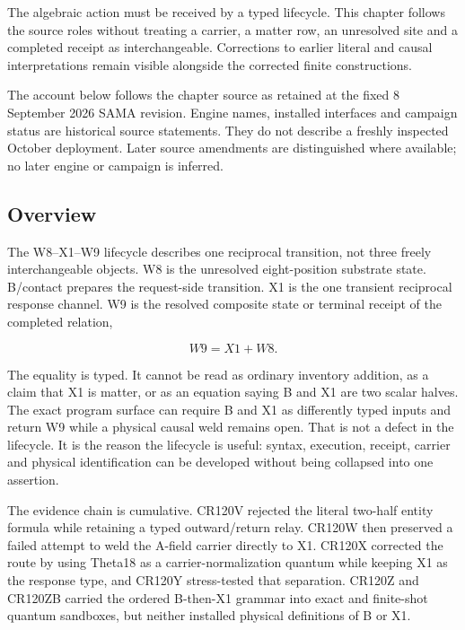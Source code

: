 \label{viii-ch05-lifecycle-reception-and-carrier-return}

The algebraic action must be received by a typed lifecycle. This chapter
follows the source roles without treating a carrier, a matter row, an
unresolved site and a completed receipt as interchangeable. Corrections
to earlier literal and causal interpretations remain visible alongside
the corrected finite constructions.

The account below follows the chapter source as retained at the fixed 8
September 2026 SAMA revision. Engine names, installed interfaces and
campaign status are historical source statements. They do not describe a
freshly inspected October deployment. Later source amendments are
distinguished where available; no later engine or campaign is inferred.

\subsection{Overview}\label{viii-ch05-overview}

The W8--X1--W9 lifecycle describes one reciprocal transition, not three
freely interchangeable objects. W8 is the unresolved eight-position
substrate state. B/contact prepares the request-side transition. X1 is
the one transient reciprocal response channel. W9 is the resolved
composite state or terminal receipt of the completed relation,

\[
W9=X1+W8.
\]

The equality is typed. It cannot be read as ordinary inventory addition,
as a claim that X1 is matter, or as an equation saying B and X1 are two
scalar halves. The exact program surface can require B and X1 as
differently typed inputs and return W9 while a physical causal weld
remains open. That is not a defect in the lifecycle. It is the reason
the lifecycle is useful: syntax, execution, receipt, carrier and
physical identification can be developed without being collapsed into
one assertion.

The evidence chain is cumulative. CR120V rejected the literal two-half
entity formula while retaining a typed outward/return relay. CR120W then
preserved a failed attempt to weld the A-field carrier directly to X1.
CR120X corrected the route by using Theta18 as a carrier-normalization
quantum while keeping X1 as the response type, and CR120Y stress-tested
that separation. CR120Z and CR120ZB carried the ordered B-then-X1
grammar into exact and finite-shot quantum sandboxes, but neither
installed physical definitions of B or X1.

